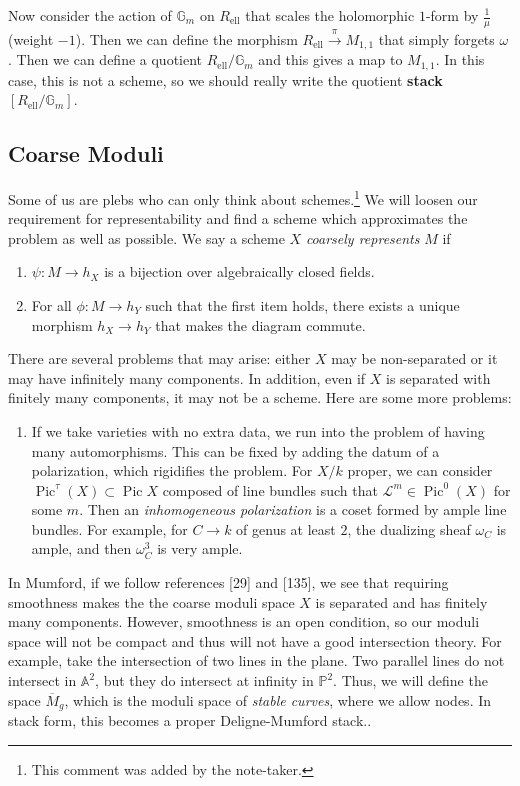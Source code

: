 \documentclass[leqno, openany]{memoir}
\theoremstyle{definition}
\theoremstyle{remark}
\theoremstyle{plain}
\theoremstyle{definition}
\theoremstyle{remark}
\newcommand{\A}{\mathbb{A}}
\newcommand{\G}{\mathbb{G}}
\renewcommand{\P}{\mathbb{P}}
\newcommand{\mc}[1]{\mathcal{#1}}
\newcommand{\mr}[1]{\mathrm{#1}}
\newcommand{\ol}[1]{\overline{#1}}
\DeclareMathOperator{\Pic}{Pic}
\begin{document}
        Now consider the action of $\G_m$ on $R_{\mr{ell}}$ that scales the
        holomorphic $1$-form by $\frac{1}{\mu}$ (weight $-1$). Then we can
        define the morphism $R_{\mr{ell}} \xrightarrow{\pi} M_{1,1}$ that
        simply forgets $\omega$. Then we can define a quotient $R_{\mr{ell}} /
        \G_m$ and this gives a map to $M_{1,1}$. In this case, this is not a
        scheme, so we should really write the quotient \textbf{stack}
        $[R_{\mr{ell}} / \G_m]$.

    \subsection{Coarse Moduli}%
    
    
    Some of us are plebs who can only think about schemes.\footnote{This
    comment was added by the note-taker.} We will loosen our requirement for
    representability and find a scheme which approximates the problem as well
    as possible. We say a scheme $X$ \textit{coarsely represents} $M$ if
    \begin{enumerate} \item $\psi \colon M \to h_X$ is a bijection over
        algebraically closed fields.  \item For all $\phi \colon M \to h_Y$
        such that the first item holds, there exists a unique morphism $h_X \to
        h_Y$ that makes the diagram commute.  \end{enumerate}

    There are several problems that may arise: either $X$ may be non-separated
    or it may have infinitely many components. In addition, even if $X$ is
    separated with finitely many components, it may not be a scheme. Here are
    some more problems: \begin{enumerate} \item If we take varieties with no
        extra data, we run into the problem of having many automorphisms. This
        can be fixed by adding the datum of a polarization, which rigidifies
        the problem. For $X/k$ proper, we can consider $\Pic^{\tau}(X) \subset
        \Pic X$ composed of line bundles such that $\mc{L}^m \in \Pic^0(X)$ for
        some $m$. Then an \textit{inhomogeneous polarization} is a coset formed
        by ample line bundles. For example, for $C \to k$ of genus at least
        $2$, the dualizing sheaf $\omega_C$ is ample, and then $\omega_C^3$ is
        very ample.  \end{enumerate} In Mumford, if we follow references [29]
        and [135], we see that requiring smoothness makes the the coarse moduli
        space $X$ is separated and has finitely many components. However,
        smoothness is an open condition, so our moduli space will not be
        compact and thus will not have a good intersection theory. For example,
        take the intersection of two lines in the plane. Two parallel lines do
        not intersect in $\A^2$, but they do intersect at infinity in $\P^2$.
        Thus, we will define the space $\ol{M}_g$, which is the moduli space of
        \textit{stable curves}, where we allow nodes. In stack form, this
        becomes a proper Deligne-Mumford stack.. 
\end{document}
